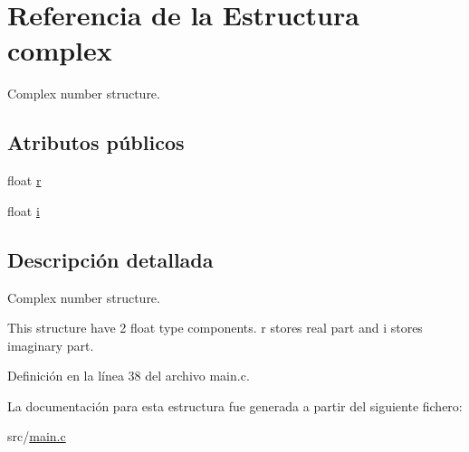 \hypertarget{structcomplex}{}\section{Referencia de la Estructura complex}
\label{structcomplex}


Complex number structure.  


\subsection*{Atributos públicos}
\begin{DoxyCompactItemize}
\item 
float \hyperlink{group___main_ga6b24d5cc84eef41dbe90b79e93de030f}{r}
\item 
float \hyperlink{group___main_ga5eefa12b02189d694af536bc7d8726be}{i}
\end{DoxyCompactItemize}


\subsection{Descripción detallada}
Complex number structure. 

This structure have 2 float type components. r stores real part and i stores imaginary part. 

Definición en la línea 38 del archivo main.\+c.



La documentación para esta estructura fue generada a partir del siguiente fichero\+:\begin{DoxyCompactItemize}
\item 
src/\hyperlink{main_8c}{main.\+c}\end{DoxyCompactItemize}
